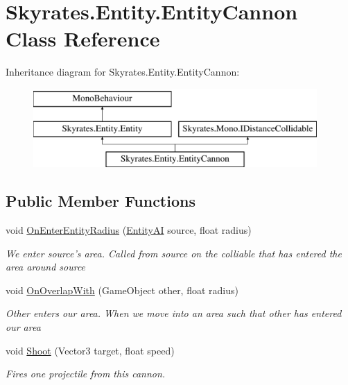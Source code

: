\hypertarget{class_skyrates_1_1_entity_1_1_entity_cannon}{\section{Skyrates.\-Entity.\-Entity\-Cannon Class Reference}
\label{class_skyrates_1_1_entity_1_1_entity_cannon}
}
Inheritance diagram for Skyrates.\-Entity.\-Entity\-Cannon\-:\begin{figure}[H]
\begin{center}
\leavevmode
\includegraphics[height=3.000000cm]{class_skyrates_1_1_entity_1_1_entity_cannon}
\end{center}
\end{figure}
\subsection*{Public Member Functions}
\begin{DoxyCompactItemize}
\item 
void \hyperlink{class_skyrates_1_1_entity_1_1_entity_cannon_a7656e5c202f143db0c6659bd199a18be}{On\-Enter\-Entity\-Radius} (\hyperlink{class_skyrates_1_1_entity_1_1_entity_a_i}{Entity\-A\-I} source, float radius)
\begin{DoxyCompactList}\small\item\em We enter source's area. Called from source on the colliable that has entered the area around source \end{DoxyCompactList}\item 
void \hyperlink{class_skyrates_1_1_entity_1_1_entity_cannon_a7c74c0b5db5b94f9fa69d91e1c6f087a}{On\-Overlap\-With} (Game\-Object other, float radius)
\begin{DoxyCompactList}\small\item\em Other enters our area. When we move into an area such that other has entered our area \end{DoxyCompactList}\item 
void \hyperlink{class_skyrates_1_1_entity_1_1_entity_cannon_a35c670c72fbdb61d2ce397f415102cc3}{Shoot} (Vector3 target, float speed)
\begin{DoxyCompactList}\small\item\em Fires one projectile from this cannon. \end{DoxyCompactList}\end{DoxyCompactItemize}
